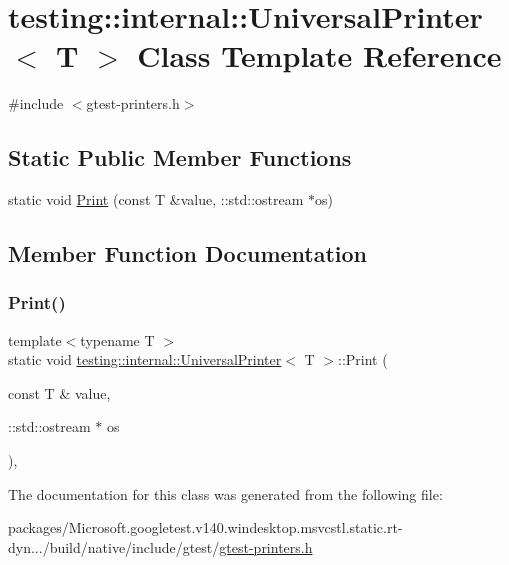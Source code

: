 \hypertarget{classtesting_1_1internal_1_1_universal_printer}{}\section{testing\+::internal\+::Universal\+Printer$<$ T $>$ Class Template Reference}
\label{classtesting_1_1internal_1_1_universal_printer}


{\ttfamily \#include $<$gtest-\/printers.\+h$>$}

\subsection*{Static Public Member Functions}
\begin{DoxyCompactItemize}
\item 
static void \mbox{\hyperlink{classtesting_1_1internal_1_1_universal_printer_aecec021e1abbaa260b701e24e3fe33eb}{Print}} (const T \&value, \+::std\+::ostream $\ast$os)
\end{DoxyCompactItemize}


\subsection{Member Function Documentation}
\mbox{\label{classtesting_1_1internal_1_1_universal_printer_aecec021e1abbaa260b701e24e3fe33eb}} 
\subsubsection{\texorpdfstring{Print()}{Print()}}
{\footnotesize\ttfamily template$<$typename T $>$ \\
static void \mbox{\hyperlink{classtesting_1_1internal_1_1_universal_printer}{testing\+::internal\+::\+Universal\+Printer}}$<$ T $>$\+::Print (\begin{DoxyParamCaption}\item[{const T \&}]{value,  }\item[{\+::std\+::ostream $\ast$}]{os }\end{DoxyParamCaption})\hspace{0.3cm}{\ttfamily [inline]}, {\ttfamily [static]}}



The documentation for this class was generated from the following file\+:\begin{DoxyCompactItemize}
\item 
packages/\+Microsoft.\+googletest.\+v140.\+windesktop.\+msvcstl.\+static.\+rt-\/dyn.../build/native/include/gtest/\mbox{\hyperlink{gtest-printers_8h}{gtest-\/printers.\+h}}\end{DoxyCompactItemize}
